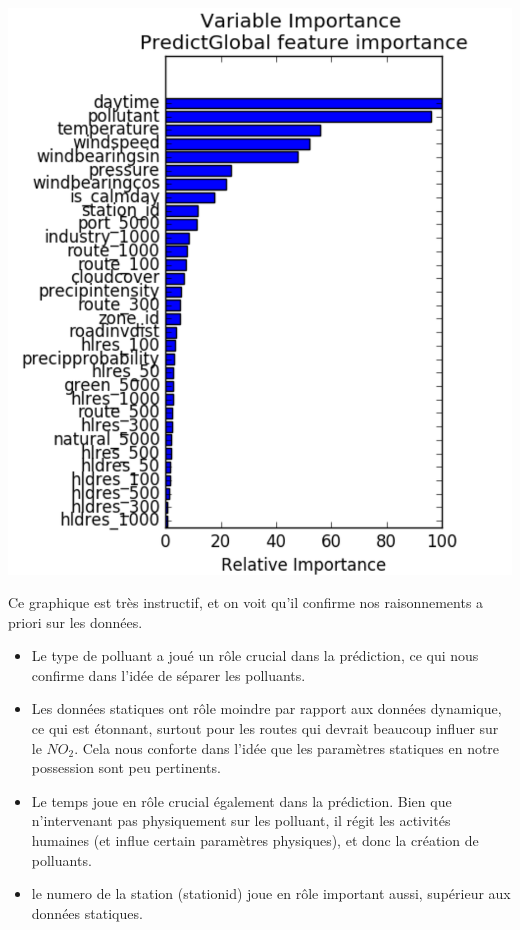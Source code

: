 \documentclass{beamer}
\begin{document}
\begin{frame}
\begin{center}
	\includegraphics{images/importance feature global.png}
\end{center}

Ce graphique est très instructif, et on voit qu'il confirme nos raisonnements a priori sur les données. 
\begin{itemize}
	\item Le type de polluant a joué un rôle crucial dans la prédiction, ce qui nous confirme dans l'idée de séparer les polluants.
	\item Les données statiques ont rôle moindre par rapport aux données dynamique, ce qui est étonnant, surtout pour les routes qui devrait beaucoup influer sur le $NO_2$. Cela nous conforte dans l'idée que les paramètres statiques en notre possession sont peu pertinents.
	\item Le temps joue en rôle crucial également dans la prédiction. Bien que n'intervenant pas physiquement sur les polluant, il régit les activités humaines (et influe certain paramètres physiques), et donc la création de polluants.
	\item le numero de la station (stationid) joue en rôle important aussi, supérieur aux données statiques. %
\end{itemize}

\end{frame}
\end{document}
